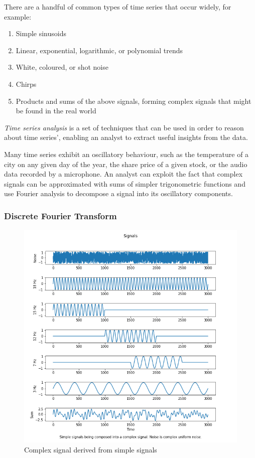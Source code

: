 \documentclass[
  paper=a4,
  ,captions=tableheading
]{scrartcl}
\begin{document}
There are a handful of common types of time series that occur widely,
for example: 

\begin{enumerate}
	\item Simple sinusoids 
	\item Linear, exponential, logarithmic, or polynomial trends 
	\item White, coloured, or shot noise 
	\item Chirps 
	\item Products and sums of the above signals, forming complex signals that might be found in the real world
\end{enumerate}

\emph{Time series analysis} is a set of techniques that can be used in
order to reason about time series', enabling an analyst to extract
useful insights from the data.

Many time series exhibit an oscillatory behaviour, such as the
temperature of a city on any given day of the year, the share price of a
given stock, or the audio data recorded by a microphone. An analyst can
exploit the fact that complex signals can be approximated with sums of
simpler trigonometric functions and use Fourier analysis to decompose a
signal into its oscillatory components.

\hypertarget{discrete-fourier-transform}{%
\subsubsection{Discrete Fourier
Transform}\label{discrete-fourier-transform}}

\begin{figure}
\centering
\includegraphics{img/composite_signal.png}
\caption{Complex signal derived from simple signals}
\end{figure}
\end{document}
